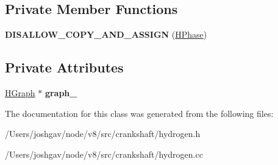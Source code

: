 \subsection*{Private Member Functions}
\begin{DoxyCompactItemize}
\item 
{\bfseries D\+I\+S\+A\+L\+L\+O\+W\+\_\+\+C\+O\+P\+Y\+\_\+\+A\+N\+D\+\_\+\+A\+S\+S\+I\+GN} (\hyperlink{classv8_1_1internal_1_1_h_phase}{H\+Phase})\hypertarget{classv8_1_1internal_1_1_h_phase_a0cdc2e0950530698845225e0978b2a85}{}\label{classv8_1_1internal_1_1_h_phase_a0cdc2e0950530698845225e0978b2a85}

\end{DoxyCompactItemize}
\subsection*{Private Attributes}
\begin{DoxyCompactItemize}
\item 
\hyperlink{classv8_1_1internal_1_1_h_graph}{H\+Graph} $\ast$ {\bfseries graph\+\_\+}\hypertarget{classv8_1_1internal_1_1_h_phase_a2c430b4a6d9952bdecfe129d57f823b1}{}\label{classv8_1_1internal_1_1_h_phase_a2c430b4a6d9952bdecfe129d57f823b1}

\end{DoxyCompactItemize}


The documentation for this class was generated from the following files\+:\begin{DoxyCompactItemize}
\item 
/\+Users/joshgav/node/v8/src/crankshaft/hydrogen.\+h\item 
/\+Users/joshgav/node/v8/src/crankshaft/hydrogen.\+cc\end{DoxyCompactItemize}
